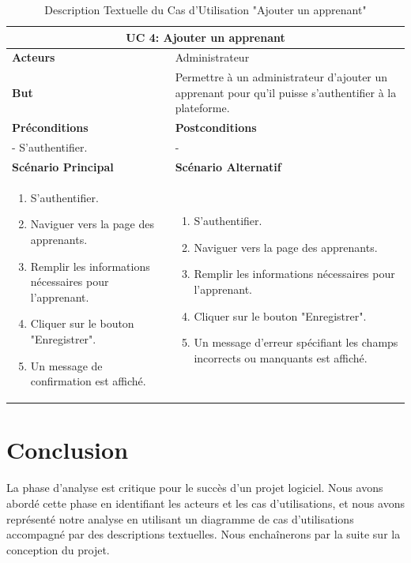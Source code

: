 \begin{minipage}{\textwidth}
\begin{table}[H]
\centering
\begin{tabular}{| m{8cm} | m{8cm} |}
\hline
\multicolumn{2}{|c|}{\textbf{UC 4:} Ajouter un apprenant} \\ \hline
\textbf{Acteurs} & Administrateur \\ \hline
\textbf{But} & Permettre à un administrateur d'ajouter un apprenant pour qu'il puisse s'authentifier à la plateforme. \\ \hline
\textbf{Préconditions} & \textbf{Postconditions} \\ \hline
- S'authentifier. & - \\ \hline
\textbf{Scénario Principal} & \textbf{Scénario Alternatif} \\ \hline
\begin{enumerate}
    \item S'authentifier.
    \item Naviguer vers la page des apprenants.
    \item Remplir les informations nécessaires pour l'apprenant.
    \item Cliquer sur le bouton "Enregistrer".
    \item Un message de confirmation est affiché.
\end{enumerate} & 
\begin{enumerate}
    \item S'authentifier.
    \item Naviguer vers la page des apprenants.
    \item Remplir les informations nécessaires pour l'apprenant.
    \item Cliquer sur le bouton "Enregistrer".
    \item Un message d'erreur spécifiant les champs incorrects ou manquants est affiché.
\end{enumerate} \\ \hline
\end{tabular}
\caption{Description Textuelle du Cas d'Utilisation "Ajouter un apprenant"}
\label{tab:use_case_description_4}
\end{table}
\end{minipage}

\clearpage

\section*{Conclusion}

La phase d’analyse est critique pour le succès d’un projet logiciel. Nous avons abordé cette phase en identifiant les acteurs et les cas d’utilisations, et nous avons représenté notre analyse en utilisant un diagramme de cas d’utilisations accompagné par des descriptions textuelles. Nous enchaînerons par la suite sur la conception du projet.
